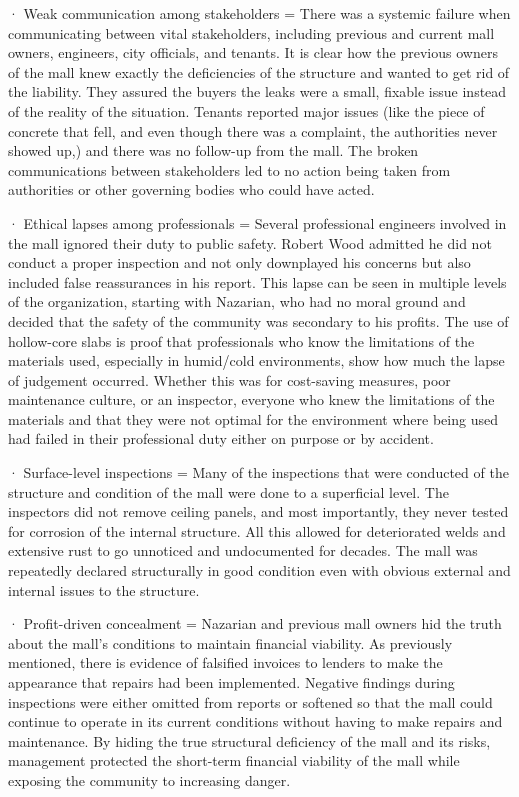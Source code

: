 \documentclass[12pt]{article}
\begin{document}
 

 · Weak communication among stakeholders = There was a systemic failure when communicating between vital stakeholders, including previous and current mall owners, engineers, city officials, and tenants. It is clear how the previous owners of the mall knew exactly the deficiencies of the structure and wanted to get rid of the liability. They assured the buyers the leaks were a small, fixable issue instead of the reality of the situation. Tenants reported major issues (like the piece of concrete that fell, and even though there was a complaint, the authorities never showed up,) and there was no follow-up from the mall. The broken communications between stakeholders led to no action being taken from authorities or other governing bodies who could have acted. 

 

 · Ethical lapses among professionals = Several professional engineers involved in the mall ignored their duty to public safety. Robert Wood admitted he did not conduct a proper inspection and not only downplayed his concerns but also included false reassurances in his report. This lapse can be seen in multiple levels of the organization, starting with Nazarian, who had no moral ground and decided that the safety of the community was secondary to his profits. The use of hollow-core slabs is proof that professionals who know the limitations of the materials used, especially in humid/cold environments, show how much the lapse of judgement occurred. Whether this was for cost-saving measures, poor maintenance culture, or an inspector, everyone who knew the limitations of the materials and that they were not optimal for the environment where being used had failed in their professional duty either on purpose or by accident. 

 

 · Surface-level inspections = Many of the inspections that were conducted of the structure and condition of the mall were done to a superficial level. The inspectors did not remove ceiling panels, and most importantly, they never tested for corrosion of the internal structure. All this allowed for deteriorated welds and extensive rust to go unnoticed and undocumented for decades. The mall was repeatedly declared structurally in good condition even with obvious external and internal issues to the structure.  

 

 

 


 · Profit-driven concealment = Nazarian and previous mall owners hid the truth about the mall's conditions to maintain financial viability. As previously mentioned, there is evidence of falsified invoices to lenders to make the appearance that repairs had been implemented. Negative findings during inspections were either omitted from reports or softened so that the mall could continue to operate in its current conditions without having to make repairs and maintenance. By hiding the true structural deficiency of the mall and its risks, management protected the short-term financial viability of the mall while exposing the community to increasing danger. 
\end{document}

